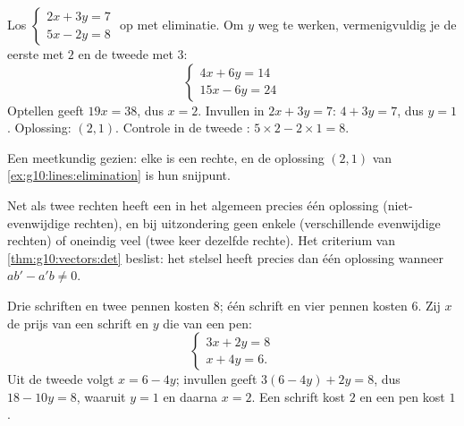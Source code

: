 \begin{example}\label{ex:g10:lines:elimination}
Los $\begin{cases} 2x + 3y = 7 \\ 5x - 2y = 8 \end{cases}$ op met eliminatie.
Om $y$ weg te werken, vermenigvuldig je de eerste  met $2$ en de
tweede met $3$:
\[
\begin{cases}
4x + 6y = 14 \\
15x - 6y = 24
\end{cases}
\]
Optellen geeft $19x = 38$, dus $x = 2$. Invullen in $2x + 3y = 7$:
$4 + 3y = 7$, dus $y = 1$. Oplossing: $(2, 1)$. Controle in de tweede
: $5 \times 2 - 2 \times 1 = 8$.
\end{example}

\begin{omfigure}

{\small Een  meetkundig gezien: elke  is een
rechte, en de oplossing $(2,1)$ van \cref{ex:g10:lines:elimination} is hun
snijpunt.}
\end{omfigure}

\begin{remark}
Net als twee rechten heeft een  in het algemeen precies één
oplossing (niet-evenwijdige rechten), en bij uitzondering geen enkele
(verschillende evenwijdige rechten) of oneindig veel (twee keer dezelfde
rechte). Het criterium van \cref{thm:g10:vectors:det} beslist: het stelsel
heeft precies dan één oplossing wanneer $ab' - a'b \neq 0$.
\end{remark}

\begin{example}\label{ex:g10:lines:modeling}
Drie schriften en twee pennen kosten $8$; één schrift en vier pennen kosten
$6$. Zij $x$ de prijs van een schrift en $y$ die van een pen:
\[
\begin{cases}
3x + 2y = 8 \\
x + 4y = 6 .
\end{cases}
\]
Uit de tweede  volgt $x = 6 - 4y$; invullen geeft
$3(6 - 4y) + 2y = 8$, dus $18 - 10y = 8$, waaruit $y = 1$ en daarna $x = 2$.
Een schrift kost $2$ en een pen kost $1$.
\end{example}

